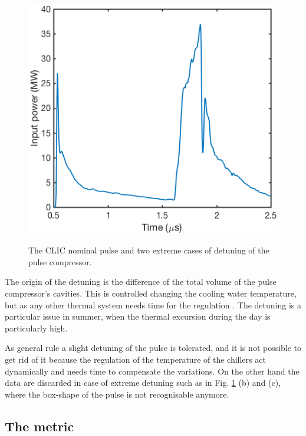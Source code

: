 \begin{figure}[h]
   {\includegraphics[scale=0.41]{pictures/Overtuning.png}}
\caption{The CLIC nominal pulse and two extreme cases of detuning of the pulse compressor.}
 \label{detuning_fig}
 \end{figure}


The origin of the detuning is the difference of the total volume of the pulse compressor's cavities. This is controlled changing the cooling water temperature, but as any other thermal system needs time for the regulation \cite{Woolley:CWS2016}. The detuning is a particular issue in summer, when the thermal excursion during the day is particularly high.

As general rule a slight detuning of the pulse is tolerated, and it is not possible to get rid of it because the regulation of the temperature of the chillers act dynamically and needs time to compensate the variations. On the other hand the data are discarded in case of extreme detuning such as in Fig. \ref{detuning_fig} (b) and (c), where the box-shape of the pulse is not recognisable anymore.



\subsection[The metric]{The metric}

